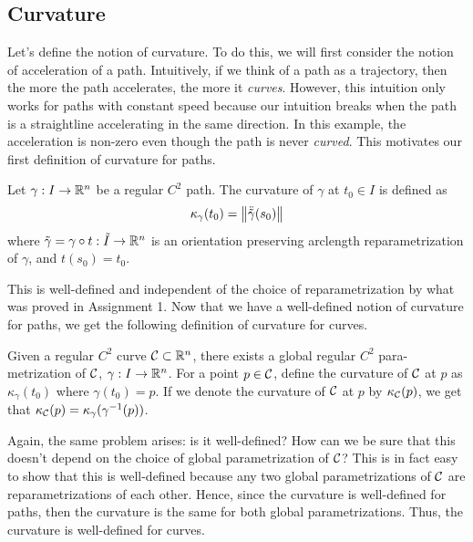 \subsection{Curvature}

Let's define the notion of curvature. To do this, we will first consider the notion of acceleration of a path. Intuitively, if we think of a path as a trajectory, then the more the path accelerates, the more it \textit{curves}. However, this intuition only works for paths with constant speed because our intuition breaks when the path is a straightline accelerating in the same direction. In this example, the acceleration is non-zero even though the path is never \textit{curved}. This motivates our first definition of curvature for paths.

\begin{definition}
    Let $\gamma : I \to \mathbb{R}^n$ be a regular $C^2$ path. The curvature of $\gamma$ at $t_0 \in I$ is defined as
    $$\kappa_{\gamma}(t_0) = \left\lVert\ddot{\tilde{\gamma}}(s_0) \right\rVert$$
    where $\tilde{\gamma} = \gamma \circ t : \tilde{I} \to \mathbb{R}^n$ is an orientation preserving arclength reparametrization of $\gamma$, and $t(s_0) = t_0$.
\end{definition}

This is well-defined and independent of the choice of reparametrization by what was proved in Assignment 1. Now that we have a well-defined notion of curvature for paths, we get the following definition of curvature for curves.

\begin{definition}
    Given a regular $C^2$ curve $\mathcal{C} \subset \mathbb{R}^n$, there exists a global regular $C^2$ para-metrization of $\mathcal{C}$, $\gamma : I \to \mathbb{R}^n$. For a point $p \in \mathcal{C}$, define the curvature of $\mathcal{C}$ at $p$ as $\kappa_{\gamma}(t_0)$ where $\gamma(t_0) = p$. If we denote the curvature of $\mathcal{C}$ at $p$ by $\kappa_{\mathcal{C}}(p)$, we get that $\kappa_{\mathcal{C}}(p) = \kappa_{\gamma}(\gamma^{-1}(p))$.
\end{definition}

Again, the same problem arises: is it well-defined? How can we be sure that this doesn't depend on the choice of global parametrization of $\mathcal{C}$? This is in fact easy to show that this is well-defined because any two global parametrizations of $\mathcal{C}$ are reparametrizations of each other. Hence, since the curvature is well-defined for paths, then the curvature is the same for both global parametrizations. Thus, the curvature is well-defined for curves.

